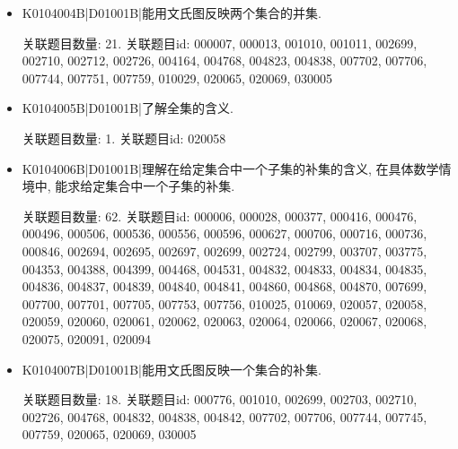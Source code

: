 \begin{itemize}
\item K0104004B|D01001B|能用文氏图反映两个集合的并集.

关联题目数量: 21. 关联题目id: 000007, 000013, 001010, 001011, 002699, 002710, 002712, 002726, 004164, 004768, 004823, 004838, 007702, 007706, 007744, 007751, 007759, 010029, 020065, 020069, 030005

\item K0104005B|D01001B|了解全集的含义.

关联题目数量: 1. 关联题目id: 020058

\item K0104006B|D01001B|理解在给定集合中一个子集的补集的含义, 在具体数学情境中, 能求给定集合中一个子集的补集.

关联题目数量: 62. 关联题目id: 000006, 000028, 000377, 000416, 000476, 000496, 000506, 000536, 000556, 000596, 000627, 000706, 000716, 000736, 000846, 002694, 002695, 002697, 002699, 002724, 002799, 003707, 003775, 004353, 004388, 004399, 004468, 004531, 004832, 004833, 004834, 004835, 004836, 004837, 004839, 004840, 004841, 004860, 004868, 004870, 007699, 007700, 007701, 007705, 007753, 007756, 010025, 010069, 020057, 020058, 020059, 020060, 020061, 020062, 020063, 020064, 020066, 020067, 020068, 020075, 020091, 020094

\item K0104007B|D01001B|能用文氏图反映一个集合的补集.

关联题目数量: 18. 关联题目id: 000776, 001010, 002699, 002703, 002710, 002726, 004768, 004832, 004838, 004842, 007702, 007706, 007744, 007745, 007759, 020065, 020069, 030005


\end{itemize}
